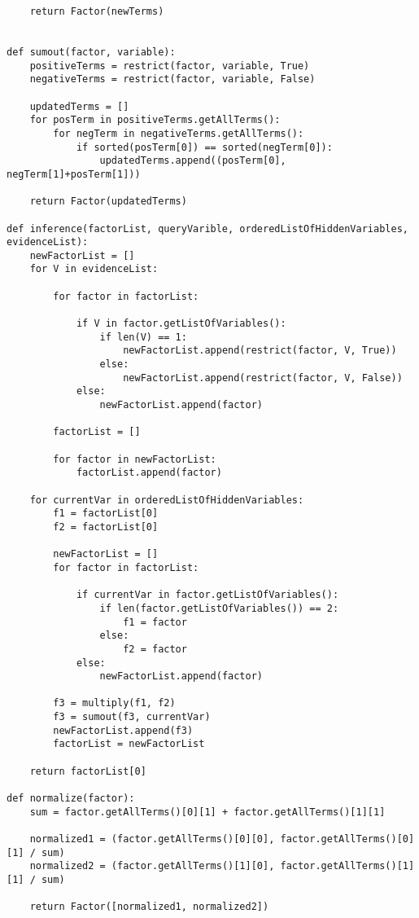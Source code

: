 \documentclass{article}
\begin{document}
\begin{titlepage}
\begin{lstlisting}
    return Factor(newTerms)


def sumout(factor, variable):
    positiveTerms = restrict(factor, variable, True)
    negativeTerms = restrict(factor, variable, False)

    updatedTerms = []
    for posTerm in positiveTerms.getAllTerms():
        for negTerm in negativeTerms.getAllTerms():
            if sorted(posTerm[0]) == sorted(negTerm[0]):
                updatedTerms.append((posTerm[0], negTerm[1]+posTerm[1]))

    return Factor(updatedTerms)

def inference(factorList, queryVarible, orderedListOfHiddenVariables, evidenceList):
    newFactorList = []
    for V in evidenceList:
        
        for factor in factorList:

            if V in factor.getListOfVariables():
                if len(V) == 1:
                    newFactorList.append(restrict(factor, V, True))
                else:
                    newFactorList.append(restrict(factor, V, False))
            else:
                newFactorList.append(factor)

        factorList = []

        for factor in newFactorList:
            factorList.append(factor)

    for currentVar in orderedListOfHiddenVariables:
        f1 = factorList[0]
        f2 = factorList[0]

        newFactorList = []
        for factor in factorList:

            if currentVar in factor.getListOfVariables():
                if len(factor.getListOfVariables()) == 2:
                    f1 = factor
                else:
                    f2 = factor
            else:
                newFactorList.append(factor)

        f3 = multiply(f1, f2)
        f3 = sumout(f3, currentVar)
        newFactorList.append(f3)
        factorList = newFactorList

    return factorList[0]

def normalize(factor):
    sum = factor.getAllTerms()[0][1] + factor.getAllTerms()[1][1]

    normalized1 = (factor.getAllTerms()[0][0], factor.getAllTerms()[0][1] / sum)
    normalized2 = (factor.getAllTerms()[1][0], factor.getAllTerms()[1][1] / sum)

    return Factor([normalized1, normalized2])


\end{lstlisting}
\end{titlepage}
\end{document}

